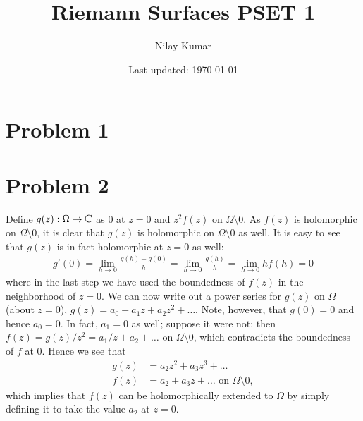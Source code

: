 \documentclass{../../mathnotes}
\title{Riemann Surfaces PSET 1}
\author{Nilay Kumar}
\date{Last updated: \today}
\begin{document}
\maketitle

\section*{Problem 1}


\section*{Problem 2}

Define $g(z):\Omega\to\mathbb{C}$ as $0$ at $z=0$ and $z^2f(z)$ on $\Omega\setminus 0$. As $f(z)$ is holomorphic on $\Omega\setminus0$, it is clear that
$g(z)$ is holomorphic on $\Omega\setminus0$ as well. It is easy to see that $g(z)$ is in fact holomorphic at $z=0$ as well:
\begin{align*}
    g'(0)=\lim_{h\to 0}\frac{g(h)-g(0)}{h}=\lim_{h\to 0}\frac{g(h)}{h}=\lim_{h\to 0}hf(h)=0
\end{align*}
where in the last step we have used the boundedness of $f(z)$ in the neighborhood of $z=0$. We can now write out a power series for $g(z)$
on $\Omega$ (about $z=0$), $g(z)=a_0+a_1z+a_2z^2+\ldots$. Note, however, that $g(0)=0$ and hence $a_0=0$. In fact, $a_1=0$ as well; suppose it were
not: then $f(z)=g(z)/z^2=a_1/z+a_2+\ldots$ on $\Omega\setminus0$, which contradicts the boundedness of $f$ at 0. Hence we see that 
\begin{align*}
    g(z)&=a_2z^2+a_3z^3+\ldots\\
    f(z)&=a_2+a_3z+\ldots\text{ on } \Omega\setminus0,
\end{align*}
which implies that $f(z)$ can be holomorphically extended to $\Omega$ by simply defining it to take the value $a_2$ at $z=0$.
\end{document}
